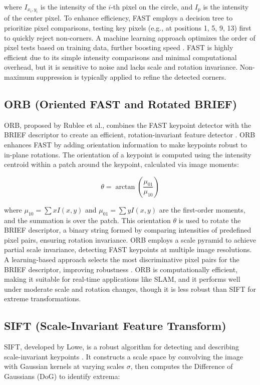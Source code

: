 \documentclass[journal]{IEEEtran}
\begin{document}
where \( I_{x_i, y_i} \) is the intensity of the \( i \)-th pixel on the circle, and \( I_p \) is the intensity of the center pixel. To enhance efficiency, FAST employs a decision tree to prioritize pixel comparisons, testing key pixels (e.g., at positions 1, 5, 9, 13) first to quickly reject non-corners. A machine learning approach optimizes the order of pixel tests based on training data, further boosting speed \cite{FAST}. FAST is highly efficient due to its simple intensity comparisons and minimal computational overhead, but it is sensitive to noise and lacks scale and rotation invariance. Non-maximum suppression is typically applied to refine the detected corners.\\

\subsection{ORB (Oriented FAST and Rotated BRIEF)}
ORB, proposed by Rublee et al., combines the FAST keypoint detector with the BRIEF descriptor to create an efficient, rotation-invariant feature detector \cite{ORB}. ORB enhances FAST by adding orientation information to make keypoints robust to in-plane rotations. The orientation of a keypoint is computed using the intensity centroid within a patch around the keypoint, calculated via image moments:

\begin{equation}
\theta = \arctan\left(\frac{\mu_{01}}{\mu_{10}}\right)
\end{equation}

where \( \mu_{10} = \sum x I(x, y) \) and \( \mu_{01} = \sum y I(x, y) \) are the first-order moments, and the summation is over the patch. This orientation \( \theta \) is used to rotate the BRIEF descriptor, a binary string formed by comparing intensities of predefined pixel pairs, ensuring rotation invariance. ORB employs a scale pyramid to achieve partial scale invariance, detecting FAST keypoints at multiple image resolutions. A learning-based approach selects the most discriminative pixel pairs for the BRIEF descriptor, improving robustness \cite{ORB}. ORB is computationally efficient, making it suitable for real-time applications like SLAM, and it performs well under moderate scale and rotation changes, though it is less robust than SIFT for extreme transformations.\\

\subsection{SIFT (Scale-Invariant Feature Transform)}
SIFT, developed by Lowe, is a robust algorithm for detecting and describing scale-invariant keypoints \cite{SIFT}. It constructs a scale space by convolving the image with Gaussian kernels at varying scales \( \sigma \), then computes the Difference of Gaussians (DoG) to identify extrema:
\end{document}
